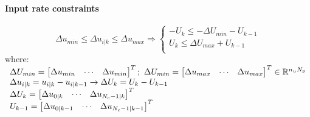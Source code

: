 \documentclass[12pt]{article}
\begin{document}
            \paragraph{Input rate constraints}
            \begin{equation}
                \Delta u_{min} \leq \Delta u_{i|k} \leq \Delta u_{max}
                \Rightarrow
                \begin{cases}
                    -U_k \leq -\Delta U_{min} - U_{k-1} \\
                    U_k \leq \Delta U_{max} + U_{k-1} \\
                \end{cases}
            \end{equation}
            where:  $ \begin{array}[t]{l}
                        \Delta U_{min} = \begin{bmatrix} \Delta u_{min} & \cdots & \Delta u_{min} \end{bmatrix}^T;\
                        \Delta U_{min} = \begin{bmatrix} \Delta u_{max} & \cdots & \Delta u_{max} \end{bmatrix}^T
                        \in \mathbb{R}^{n_u N_p}
                        \\
                        \Delta u_{i|k} = u_{i|k} - u_{i|k-1} \rightarrow \Delta U_{k} = U_{k} - U_{k-1} \\
                        \Delta U_{k} = \begin{bmatrix} \Delta u_{0|k} & \cdots & \Delta u_{N_c-1|k} \end{bmatrix}^T \\
                        U_{k-1} = \begin{bmatrix} \Delta u_{0|k-1} & \cdots & \Delta u_{N_c-1|k-1} \end{bmatrix}^T \\
                    \end{array} $ \\


                            
\end{document}
